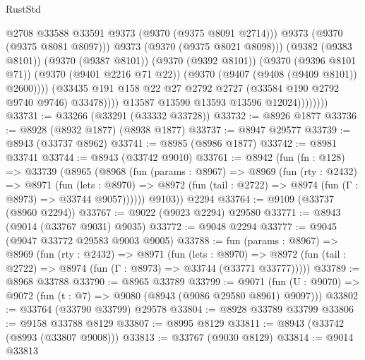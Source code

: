 \begin{lexlean}{RustStd}
\begin{coremodule}
{\begin{coremodule}
{{{{{{{{{{{{{{{{{{{{{{{{{{{{{{{{{{{{{{{                                    @2708
                                    @33588
                                    @33591
                                    @9373
                                    (@9370 (@9375 @8091 @2714)))
                                  @9373
                                  (@9370 (@9375 @8081 @8097)))
                                @9373
                                (@9370 (@9375 @8021 @8098)))
                              (@9382 (@9383 @8101))
                              (@9370 (@9387 @8101))
                              (@9370 (@9392 @8101))
                              (@9370 (@9396 @8101 @71))
                              (@9370 (@9401 @2216 @71 @22))
                              (@9370 (@9407 (@9408 (@9409 @8101)) @2600))))
                          (@33435
                            @191
                            @158
                            @22
                            @27
                            @2792
                            @2727
                            (@33584 @190 @2792 @9740 @9746)
                            @33478))))
                    @13587
                    @13590
                    @13593
                    @13596
                    @12024))))))))
@33731 := @33266 (@33291 (@33332 @33728))
@33732 := @8926 @1877
@33736 := @8928 (@8932 @1877) (@8938 @1877)
@33737 := @8947 @29577
@33739 := @8943 (@33737 @8962)
@33741 := @8985 (@8986 @1877)
@33742 := @8981 @33741
@33744 := @8943 (@33742 @9010)
@33761 := @8942
    (fun (fn : @128) =>
    @33739
      (@8965
        (@8968
          (fun (params : @8967) =>
          @8969
            (fun (rty : @2432) =>
            @8971
              (fun (lets : @8970) =>
              @8972 (fun (tail : @2722) => @8974 (fun (Γ : @8973) => @33744 @9057))))))
        @9103))
    @2294
@33764 := @9109 (@33737 (@8960 @2294))
@33767 := @9022 (@9023 @2294) @29580
@33771 := @8943 (@9014 (@33767 @9031) @9035)
@33772 := @9048 @2294
@33777 := @9045 (@9047 @33772 @29583 @9003 @9005)
@33788 := fun (params : @8967) =>
  @8969
    (fun (rty : @2432) =>
    @8971
      (fun (lets : @8970) =>
      @8972 (fun (tail : @2722) => @8974 (fun (Γ : @8973) => @33744 (@33771 @33777)))))
@33789 := @8968 @33788
@33790 := @8965 @33789
@33799 := @9071
    (fun (U : @9070) => @9072 (fun (t : @7) => @9080 (@8943 (@9086 @29580 @8961) @9097)))
@33802 := @33764 (@33790 @33799) @29578
@33804 := @8928 @33789 @33799
@33806 := @9158 @33788 @8129
@33807 := @8995 @8129
@33811 := @8943 (@33742 (@8993 (@33807 @9008)))
@33813 := @33767 (@9030 @8129)
@33814 := @9014 @33813
}}}}}}}}}}}}}}}}}}}}}}}}}}}}}}}}}}}}}}}
\end{coremodule}}
\end{coremodule}
\end{lexlean}
